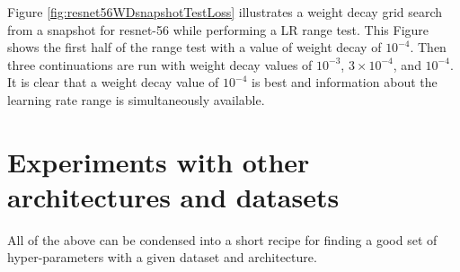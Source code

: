 \documentclass{article} %
\begin{document}
Figure \ref{fig:resnet56WDsnapshotTestLoss} illustrates a weight decay grid search from a snapshot for resnet-56 while performing a LR range test.  This Figure shows the first half of the range test with a value of weight decay of $10^{-4}$.  Then three continuations are run with weight decay values of $10^{-3}$, $3 \times 10^{-4}$, and $10^{-4}$.  It is clear that a weight decay value of $10^{-4}$ is best and information about the learning rate range is simultaneously available.



\section{Experiments with other architectures and datasets}
\label{sec:other}

All of the above can be condensed into a short recipe for finding a good set of hyper-parameters with a given dataset and architecture.
\end{document}
